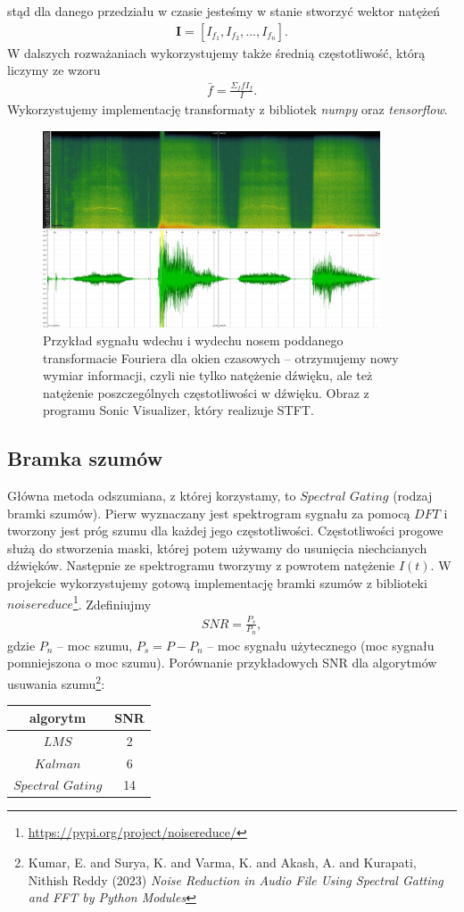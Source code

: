 \documentclass[polish]{article}
\begin{document}
stąd dla danego przedziału w czasie jesteśmy w stanie stworzyć wektor natężeń
\begin{gather*}
	\boldsymbol{I} = [I_{f_1}, I_{f_2}, ..., I_{f_n}].
\end{gather*}
W dalszych rozważaniach wykorzystujemy także średnią częstotliwość, którą liczymy ze wzoru
\begin{gather*}
	\bar{f} = \frac{\Sigma_ffI_f}{I}.
\end{gather*}
Wykorzystujemy implementację transformaty z bibliotek \textit{numpy} oraz \textit{tensorflow}.
\begin{figure}[H]
	\centering
	\includegraphics[width=10cm]{stft2}
	\caption{Przykład sygnału wdechu i wydechu nosem poddanego transformacie Fouriera dla okien czasowych -- otrzymujemy nowy wymiar informacji, czyli nie tylko natężenie
dźwięku, ale też natężenie poszczególnych częstotliwości w dźwięku. Obraz z programu Sonic Visualizer, który realizuje STFT.}
\end{figure}

\subsection{Bramka szumów}
Główna metoda odszumiana, z której korzystamy, to $Spectral$ $Gating$ (rodzaj bramki szumów). Pierw wyznaczany jest spektrogram sygnału za pomocą $DFT$ i 
tworzony jest próg szumu dla każdej jego częstotliwości.
Częstotliwości progowe służą do stworzenia maski, której potem używamy do usunięcia niechcianych dźwięków.
Następnie ze spektrogramu tworzymy z powrotem natężenie $I(t)$. W projekcie wykorzystujemy gotową implementację bramki szumów z biblioteki $noisereduce$\footnote{\url{https://pypi.org/project/noisereduce/}}. Zdefiniujmy
\begin{gather*}
	SNR = \frac{P_s}{P_n},
\end{gather*}
gdzie $P_n$ -- moc szumu, $P_s = P - P_n$ -- moc sygnału użytecznego (moc sygnału pomniejszona o moc szumu).
Porównanie przykładowych SNR dla algorytmów usuwania szumu\footnote{Kumar, E. and Surya, K. and Varma, K. and Akash, A. and Kurapati, Nithish Reddy (2023) \emph{Noise Reduction in Audio File Using Spectral Gatting and FFT by Python Modules}}:
\begin{center}
\begin{tabular}{c  | c }
algorytm & SNR \\
\hline
$LMS$ & 2 \\
$Kalman$ & 6 \\
$Spectral$ $Gating$ & 14
\end{tabular}
\end{center}
\end{document}
